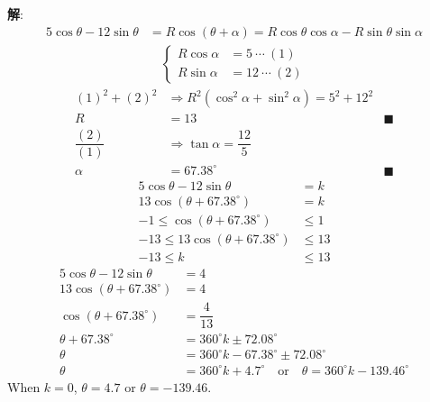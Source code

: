 \documentclass{report}
\newcommand{\sol}{\vspace{0.2cm}\textbf{解}:}
\begin{document}
\begin{enumerate}[leftmargin=*]
\begin{enumerate}
            \sol{}
            \begin{align*}
                5 \cos \theta-12 \sin \theta &= R \cos (\theta+\alpha) = R\cos\theta\cos\alpha - R\sin\theta\sin\alpha
            \end{align*}
            \begin{align*}
                \begin{cases}
                    R\cos\alpha &= 5\ \cdots\ (1)\\
                    R\sin\alpha &= 12\ \cdots\ (2)
                \end{cases}
            \end{align*}
            \begin{align*}
                (1)^2 + (2)^2 &\Rightarrow R^2(\cos^2\alpha + \sin^2\alpha) = 5^2 + 12^2\\
                R &= 13 &\blacksquare\\
                \dfrac{(2)}{(1)} &\Rightarrow \tan\alpha = \dfrac{12}{5}\\
                \alpha &= 67.38^{\circ} &\blacksquare
            \end{align*}
            \newpage
            \begin{align*}
                 5 \cos \theta-12 \sin \theta &= k\\
                 13\cos\left(\theta + 67.38^{\circ}\right) &= k\\
                 -1 \leq \cos\left(\theta + 67.38^{\circ}\right) &\leq 1\\
                    -13 \leq 13\cos\left(\theta + 67.38^{\circ}\right) &\leq 13\\
                    -13 \leq k &\leq 13
            \end{align*}
            \begin{align*}
                5 \cos \theta-12 \sin \theta &= 4\\
                13\cos\left(\theta + 67.38^{\circ}\right) &= 4\\
                \cos\left(\theta + 67.38^{\circ}\right) &= \dfrac{4}{13}\\
                \theta + 67.38^{\circ} &= 360^{\circ}k \pm 72.08^{\circ}\\
                \theta &= 360^{\circ}k - 67.38^{\circ} \pm 72.08^{\circ}\\
                \theta &= 360^{\circ}k + 4.7^{\circ} \quad \text{or} \quad \theta = 360^{\circ}k - 139.46^{\circ}
            \end{align*}
            When $k = 0$, $\theta = 4.7$ or $\theta = -139.46$.


\end{enumerate}
\end{enumerate}
\end{document}
